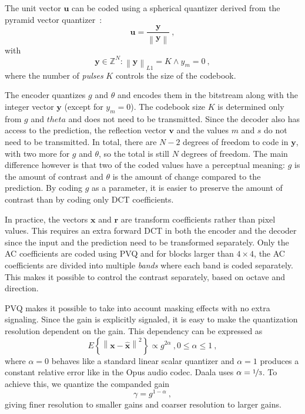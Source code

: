 \documentclass[english,conference,10pt]{IEEEtran}
\begin{document}
The unit vector $\mathbf{u}$ can be coded using a spherical quantizer derived
from the pyramid vector quantizer~\cite{Fischer1986}:
\begin{equation}
\mathbf{u}=\frac{\mathbf{y}}{\left\|\mathbf{y}\right\|}\ ,
\end{equation}
with
\begin{equation}
\mathbf{y} \in \mathbb{Z}^N : \left\|\mathbf{y}\right\|_{L1} = K \land y_m=0\ ,
\end{equation}
where the number of \textit{pulses} $K$ controls the size of the codebook.

The encoder quantizes $g$ and $\theta$ and encodes them in the bitstream along
with the integer vector $\mathbf{y}$ (except for $y_m=0$). The codebook
size $K$ is determined only from $g$ and $theta$ and does not need to be
transmitted. Since the decoder also has access to the prediction, the
reflection vector $\mathbf{v}$ and the values $m$ and $s$ do not need to
be transmitted. In total, there are $N-2$ degrees of freedom to code in
$\mathbf{y}$, with two more for $g$ and $\theta$, so the total is still
$N$ degrees of freedom. The main difference however is that two of the
coded values have a perceptual meaning: $g$ is the amount of contrast and
$\theta$ is the amount of change compared to the prediction. By coding $g$
as a parameter, it is easier to preserve the amount of contrast than by
coding only DCT coefficients.

In practice, the vectors $\mathbf{x}$ and $\mathbf{r}$ are transform
coefficients rather than pixel values. This requires an extra forward DCT
in both the encoder and the decoder since the input and the prediction need
to be transformed separately. Only the AC coefficients are coded using PVQ
and for blocks larger than $4\times 4$, the AC coefficients are divided into multiple
\textit{bands} where each band is coded separately. This makes it possible
to control the contrast separately, based on octave and direction.

PVQ makes it possible to take into account masking effects with no
extra signaling. Since the gain is explicitly signaled, it is easy to make
the quantization resolution dependent on the gain. This dependency can be
expressed as
\begin{equation}
E\left\lbrace \left\| \mathbf{x} - \hat{\mathbf{x}} \right\|^2 \right\rbrace
\propto g^{2\alpha}\ , 0 \leq \alpha \leq 1\ ,
\end{equation}
where $\alpha=0$ behaves like a standard linear scalar quantizer and
$\alpha=1$ produces a constant relative error like in the Opus audio codec.
Daala uses $\alpha = \nicefrac{1}{3}$. To achieve this, we quantize the
companded gain
\begin{equation}
\gamma = g^{1-\alpha}\ ,
\end{equation}
giving finer resolution to smaller gains and coarser resolution to larger
gains.
\end{document}

